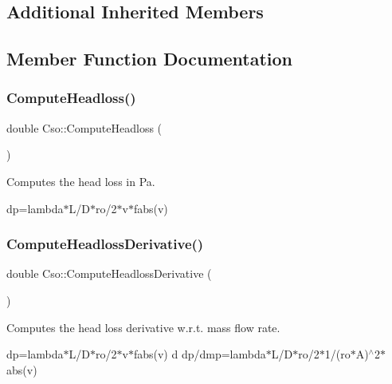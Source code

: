 \subsection*{Additional Inherited Members}


\subsection{Member Function Documentation}
\mbox{\label{class_cso_a796d4ff0f69732001c91abe7e5ce7ed7}} 
\subsubsection{\texorpdfstring{Compute\+Headloss()}{ComputeHeadloss()}}
{\footnotesize\ttfamily double Cso\+::\+Compute\+Headloss (\begin{DoxyParamCaption}{ }\end{DoxyParamCaption})}



Computes the head loss in Pa. 

dp\textquotesingle{}=lambda$\ast$\+L/\+D$\ast$ro/2$\ast$v$\ast$fabs(v) \mbox{\label{class_cso_a5f8536643bc971ca70aebef850fa53a1}} 
\subsubsection{\texorpdfstring{Compute\+Headloss\+Derivative()}{ComputeHeadlossDerivative()}}
{\footnotesize\ttfamily double Cso\+::\+Compute\+Headloss\+Derivative (\begin{DoxyParamCaption}{ }\end{DoxyParamCaption})}



Computes the head loss derivative w.\+r.\+t. mass flow rate. 

dp\textquotesingle{}=lambda$\ast$\+L/\+D$\ast$ro/2$\ast$v$\ast$fabs(v) d dp\textquotesingle{}/dmp=lambda$\ast$\+L/\+D$\ast$ro/2$\ast$1/(ro$\ast$A)$^\wedge$2$\ast$abs(v) \mbox{\label{class_cso_a113196b16e49417924fea36b770f4d84}} 
